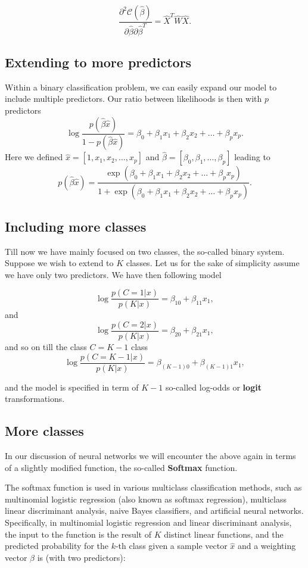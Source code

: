 \documentclass[%
oneside,                 %
final,                   %
10pt]{article}
\begin{document}
\[
\frac{\partial^2 \mathcal{C}(\hat{\beta})}{\partial \hat{\beta}\partial \hat{\beta}^T} = \hat{X}^T\hat{W}\hat{X}. 
\]

\subsection*{Extending to more predictors}

Within a binary classification problem, we can easily expand our model to include multiple predictors. Our ratio between likelihoods is then with $p$ predictors
\[
\log{ \frac{p(\hat{\beta}\hat{x})}{1-p(\hat{\beta}\hat{x})}} = \beta_0+\beta_1x_1+\beta_2x_2+\dots+\beta_px_p.
\]
Here we defined $\hat{x}=[1,x_1,x_2,\dots,x_p]$ and $\hat{\beta}=[\beta_0, \beta_1, \dots, \beta_p]$ leading to
\[
p(\hat{\beta}\hat{x})=\frac{ \exp{(\beta_0+\beta_1x_1+\beta_2x_2+\dots+\beta_px_p)}}{1+\exp{(\beta_0+\beta_1x_1+\beta_2x_2+\dots+\beta_px_p)}}.
\]

\subsection*{Including more classes}

Till now we have mainly focused on two classes, the so-called binary
system. Suppose we wish to extend to $K$ classes.  Let us for the sake
of simplicity assume we have only two predictors. We have then following model

\[
\log{\frac{p(C=1\vert x)}{p(K\vert x)}} = \beta_{10}+\beta_{11}x_1,
\]
and 
\[
\log{\frac{p(C=2\vert x)}{p(K\vert x)}} = \beta_{20}+\beta_{21}x_1,
\]
and so on till the class $C=K-1$ class
\[
\log{\frac{p(C=K-1\vert x)}{p(K\vert x)}} = \beta_{(K-1)0}+\beta_{(K-1)1}x_1,
\]

and the model is specified in term of $K-1$ so-called log-odds or
\textbf{logit} transformations.


\subsection*{More classes}

In our discussion of neural networks we will encounter the above again
in terms of a slightly modified function, the so-called \textbf{Softmax} function.

The softmax function is used in various multiclass classification
methods, such as multinomial logistic regression (also known as
softmax regression), multiclass linear discriminant analysis, naive
Bayes classifiers, and artificial neural networks.  Specifically, in
multinomial logistic regression and linear discriminant analysis, the
input to the function is the result of $K$ distinct linear functions,
and the predicted probability for the $k$-th class given a sample
vector $\hat{x}$ and a weighting vector $\hat{\beta}$ is (with two
predictors):
\end{document}

